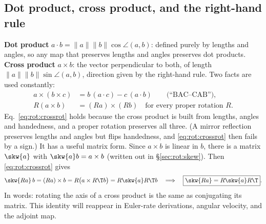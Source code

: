 \subsection{Dot product, cross product, and the right-hand rule}\label{sec:rot:dot-product-cross}
\textbf{Dot product} $a\cdot b=\|a\|\|b\|\cos\angle(a,b)$: defined purely by lengths and angles, so any map that preserves lengths and angles preserves dot products. \textbf{Cross product} $a\times b$: the vector perpendicular to both, of length $\|a\|\|b\|\sin\angle(a,b)$, direction given by the right-hand rule. Two facts are used constantly:
\begin{align}
a\times(b\times c) &= b\,(a\cdot c) - c\,(a\cdot b) \qquad\text{(``BAC--CAB'')},\label{eq:rot:bac}\\
R(a\times b) &= (Ra)\times(Rb)\quad\text{for every proper rotation } R. \label{eq:rot:crossrot}
\end{align}
Eq.~\eqref{eq:rot:crossrot} holds because the cross product is built from lengths, angles and handedness, and a proper rotation preserves all three. (A mirror reflection preserves lengths and angles but flips handedness, and \eqref{eq:rot:crossrot} then fails by a sign.) It has a useful matrix form. Since $a\times b$ is linear in $b$, there is a matrix $\skw{a}$ with $\skw{a}b=a\times b$ (written out in \S\ref{sec:rot:skew}). Then \eqref{eq:rot:crossrot} gives
\begin{equation}
\skw{Ra}\,b=(Ra)\times b = R\big(a\times R\T b\big)=R\skw{a}R\T b\quad\Longrightarrow\quad \boxed{\skw{Ra}=R\skw{a}R\T}. \label{eq:rot:conj}
\end{equation}
In words: rotating the axis of a cross product is the same as conjugating its matrix. This identity will reappear in Euler-rate derivations, angular velocity, and the adjoint map.
